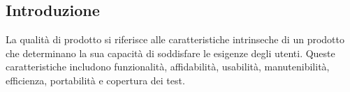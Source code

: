 \subsection{Introduzione}
La qualità di prodotto si riferisce alle caratteristiche intrinseche di un prodotto che determinano la sua capacità di soddisfare le esigenze degli utenti.
Queste caratteristiche includono funzionalità, affidabilità, usabilità, manutenibilità, efficienza, portabilità e copertura dei test.